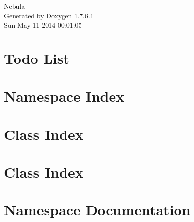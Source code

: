 \documentclass[a4paper]{book}
\begin{document}
\hypersetup{pageanchor=false,citecolor=blue}
\begin{titlepage}
\vspace*{7cm}
\begin{center}
{\Large \-Nebula }\\
\vspace*{1cm}
{\large \-Generated by Doxygen 1.7.6.1}\\
\vspace*{0.5cm}
{\small Sun May 11 2014 00:01:05}\\
\end{center}
\end{titlepage}
\clearemptydoublepage
{}
\tableofcontents
\clearemptydoublepage
{}
\hypersetup{pageanchor=true,citecolor=blue}
\chapter{\-Todo \-List}
\label{todo}
\hypertarget{todo}{}

\chapter{\-Namespace \-Index}

\chapter{\-Class \-Index}

\chapter{\-Class \-Index}

\chapter{\-Namespace \-Documentation}









\end{document}
